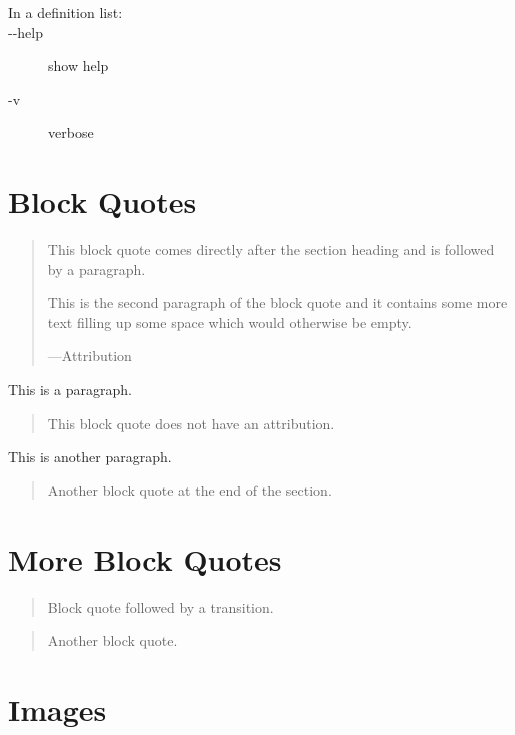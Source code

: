 \documentclass[a4paper]{article}
\providecommand*{\DUoptionlistlabel}[1]{\bfseries #1 \hfill}
\newenvironment{DUoptionlist}{%
    \list{}{\setlength{\labelwidth}{\DUoptionlistindent}
            \setlength{\rightmargin}{1cm}
            \setlength{\leftmargin}{\rightmargin}
            \addtolength{\leftmargin}{\labelwidth}
            \addtolength{\leftmargin}{\labelsep}
            \renewcommand{\makelabel}{\DUoptionlistlabel}}
  }
  {\endlist}
\providecommand*{\DUtransition}{%
  \hspace*{\fill}\hrulefill\hspace*{\fill}
  \vskip 0.5\baselineskip
}
\begin{document}
\begin{description}
\item[{In a definition list:}] \leavevmode
\begin{DUoptionlist}
\item[-{}-help]  show help

\item[-v]  verbose
\end{DUoptionlist}

\end{description}


\section{Block Quotes%
  \label{block-quotes}%
}

\begin{quote}
This block quote comes directly after the section heading and is
followed by a paragraph.

This is the second paragraph of the block quote and it contains
some more text filling up some space which would otherwise be
empty.
\nopagebreak

\raggedleft —Attribution
\end{quote}

This is a paragraph.

\begin{quote}
This block quote does not have an attribution.
\end{quote}

This is another paragraph.

\begin{quote}
Another block quote at the end of the section.
\end{quote}


\section{More Block Quotes%
  \label{more-block-quotes}%
}

\begin{quote}
Block quote followed by a transition.
\end{quote}

\DUtransition

\begin{quote}
Another block quote.
\end{quote}


\section{Images%
  \label{images}%
}
\end{document}
